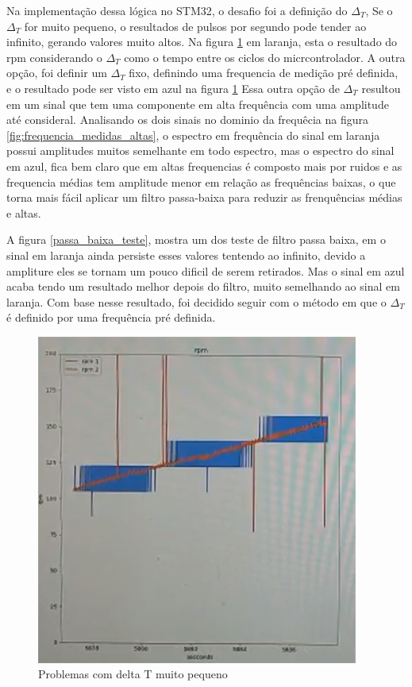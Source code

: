 Na implementação dessa lógica no STM32, o desafio foi a definição do $\Delta_{T}$,
Se o $\Delta_{T}$ for muito pequeno, o resultados de pulsos por segundo pode tender ao infinito, gerando valores muito altos.
Na figura \ref{fig:medidas_altas} em laranja, esta o resultado do rpm considerando o $\Delta_{T}$ como o tempo entre os ciclos do micrcontrolador.
A outra opção, foi definir um $\Delta_{T}$ fixo, definindo uma frequencia de medição pré definida, e o resultado pode ser visto em azul na figura \ref{fig:medidas_altas}
Essa outra opção de $\Delta_{T}$ resultou em um sinal que tem uma componente em alta frequência com uma amplitude até consideral.
Analisando os dois sinais no dominio da frequêcia na figura \ref{fig:frequencia_medidas_altas}, o espectro em frequência do sinal em laranja possui amplitudes muitos semelhante em todo espectro, mas o espectro do sinal em azul, fica bem claro que em altas frequencias é composto mais por ruidos
e as frequencia médias tem amplitude menor em relação as frequências baixas, o que torna mais fácil aplicar um filtro passa-baixa para reduzir as frenquências médias e altas.

A figura \autoref{passa_baixa_teste}, mostra um dos teste de filtro passa baixa, em o sinal em laranja ainda persiste esses valores tentendo ao infinito, devido a ampliture eles se tornam um pouco dificil de serem retirados.
Mas o sinal em azul acaba tendo um resultado melhor depois do filtro, muito semelhando ao sinal em laranja.
Com base nesse resultado, foi decidido seguir com o método em que o $\Delta_{T}$ é definido por uma frequência pré definida.


\begin{figure}[h]
    \centering
    \includegraphics{figures/medidas_altas}
    \caption{Problemas com delta T muito pequeno}
    \label{fig:medidas_altas}
\end{figure}

